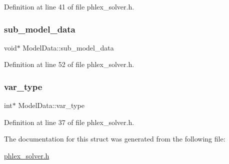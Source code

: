 Definition at line 41 of file phlex\+\_\+solver.\+h.

\mbox{\label{struct_model_data_aca07574f72ee4e6ccc97054b31fed5de}} 
\subsubsection{\texorpdfstring{sub\+\_\+model\+\_\+data}{sub\_model\_data}}
{\footnotesize\ttfamily void$\ast$ Model\+Data\+::sub\+\_\+model\+\_\+data}



Definition at line 52 of file phlex\+\_\+solver.\+h.

\mbox{\label{struct_model_data_a24ff4cb5a71b0302982382a3f1ac7c0c}} 
\subsubsection{\texorpdfstring{var\+\_\+type}{var\_type}}
{\footnotesize\ttfamily int$\ast$ Model\+Data\+::var\+\_\+type}



Definition at line 37 of file phlex\+\_\+solver.\+h.



The documentation for this struct was generated from the following file\+:\begin{DoxyCompactItemize}
\item 
\mbox{\hyperlink{phlex__solver_8h}{phlex\+\_\+solver.\+h}}\end{DoxyCompactItemize}
